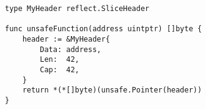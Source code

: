 \begin{lstlisting}[language=Golang, label=lst:go-safer-sliceheader-alternative-code, caption=\textit{SliceHeader} alias type detected by \toolSafer{}]
type MyHeader reflect.SliceHeader

func unsafeFunction(address uintptr) []byte {
    header := &MyHeader{
        Data: address,
        Len:  42,
        Cap:  42,
    }
    return *(*[]byte)(unsafe.Pointer(header))
}
\end{lstlisting}
